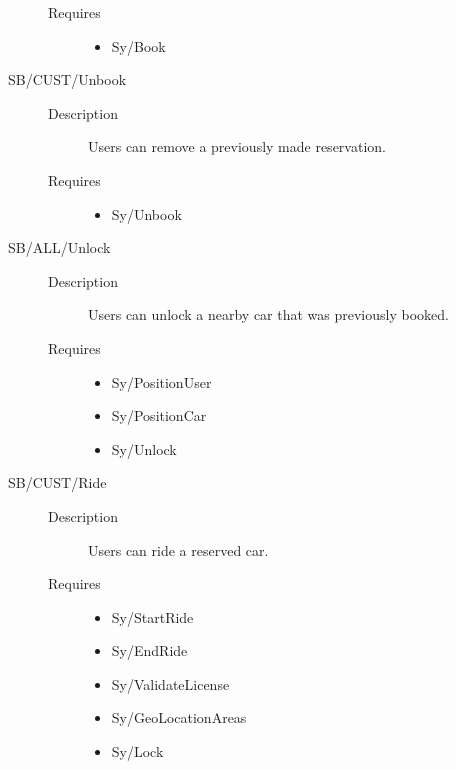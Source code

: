 \documentclass[11pt]{article} %
\begin{document}
\begin{description}
\begin{description}
		\item[Requires] \hfill
		\begin{itemize}
			\item Sy/Book %
		\end{itemize}
	\end{description}
	\item[SB/CUST/Unbook] \hfill
	\begin{description}
		\item[Description] Users can remove a previously made reservation.
		\item[Requires] \hfill
		\begin{itemize}
			\item Sy/Unbook %
		\end{itemize}
	\end{description}
	\item[SB/ALL/Unlock] \hfill
	\begin{description}
		\item[Description] Users can unlock a nearby car that was previously booked.
		\item[Requires] \hfill
		\begin{itemize}
			\item Sy/PositionUser %
			\item Sy/PositionCar %
			\item Sy/Unlock %
		\end{itemize}
	\end{description}
	\item[SB/CUST/Ride] \hfill
	\begin{description}
		\item[Description] Users can ride a reserved car.
		\item[Requires] \hfill
		\begin{itemize}
			\item Sy/StartRide %
			\item Sy/EndRide %
			\item Sy/ValidateLicense %
			\item Sy/GeoLocationAreas %
			\item Sy/Lock %
		\end{itemize}
	\end{description}

\end{description}
\end{document}
